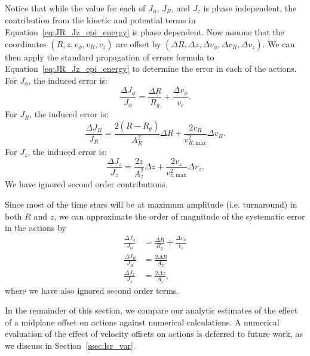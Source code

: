 \documentclass[twocolumn]{aastex62}
\newcommand{\beq}{\begin{equation}}
\newcommand{\eeq}{\end{equation}}
\begin{document}
Notice that while the value for each of $J_{\phi}$, $J_R$, and $J_z$ is phase
independent, the contribution from the kinetic and potential terms in
Equation~\eqref{eq:JR_Jz_epi_energy} is phase dependent. Now assume that the
coordinates $(R, z, v_{\phi}, v_R, v_z)$ are offset by $(\Delta R, \Delta z,
\Delta v_{\phi}, \Delta v_R, \Delta v_z)$. We can then apply the standard
propagation of errors formula to Equation~\eqref{eq:JR_Jz_epi_energy} to
determine the error in each of the actions. For $J_{\phi}$, the induced error
is:
\beq\label{eq:induced_Jphi}
\frac{\Delta J_{\phi}}{J_{\phi}} = \frac{\Delta R}{R_g} 
                                    + \frac{\Delta v_{\phi}}{v_c}\text{.}
\eeq
For $J_R$, the induced error is:
\beq\label{eq:induced_JR}
\frac{\Delta J_R}{J_R} = \frac{2(R-R_g)}{A_R^2}\Delta R
                         + \frac{2v_R}{v_{R,\text{max}}^2} \Delta v_R \text{.}
\eeq
For $J_z$, the induced error is:
\beq\label{eq:induced_Jz}
\frac{\Delta J_z}{J_z} = \frac{2z}{A_z^2}\Delta z
                         + \frac{2v_z}{v_{z,\text{max}}^2} \Delta v_z \text{.}
\eeq
We have ignored second order contributions.

Since most of the time stars will be at maximum amplitude (i.e. turnaround) in
both $R$ and $z$, we can approximate the order of magnitude of the systematic
error in the actions by
\beq\label{eq:Ji_err_mosttime}
\begin{split}
\frac{\Delta J_{\phi}}{J_{\phi}} &= \frac{\Delta R}{R_g} 
                                    + \frac{\Delta v_{\phi}}{v_c} \\
\frac{\Delta J_{R}}{J_{R}} &= \frac{2\Delta R}{A_R} \\
\frac{\Delta J_{z}}{J_{z}} &= \frac{2\Delta z}{A_z} \text{,}
\end{split}
\eeq
where we have also ignored second order terms.

In the remainder of this section, we compare our analytic estimates of the
effect of a midplane offset on actions against numerical calculations. A
numerical evaluation of the effect of velocity offsets on actions is deferred
to future work, as we discuss in Section~\ref{ssec:lsr_var}.
\end{document}
